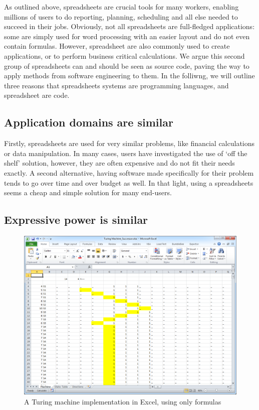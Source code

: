 \documentclass[conference]{IEEEtran}
\begin{document}


As outlined above, spreadsheets are crucial tools for many workers, enabling millions of users to do reporting, planning, scheduling and all else needed to succeed in their jobs. Obviously, not all spreadsheets are full-fledged applications: some are simply used for word processing with an easier layout and do not even contain formulas. However, spreadsheet are also commonly used to create applications, or to perform business critical calculations. We argue this second group of spreadsheets can and should be seen as source code, paving the way to apply methods from software engineering to them. In the folliwng, we will outline three reasons that spreadsheets systems are programming languages, and spreadsheet are code.

\subsection{Application domains are similar}
Firstly, spreadsheets are used for very similar problems, like financial calculations or data manipulation. In many cases, users have investigated the use of ‘off the shelf’ solution, however, they are often expensive and do not fit their needs exactly. A second alternative, having software made specifically for their problem tends to go over time and over budget as well. In that light, using a spreadsheets seems a cheap and simple solution for many end-users.

\subsection{Expressive power is similar}

\begin{figure}
  \begin{center}
  \includegraphics[width=\columnwidth]{fig/turing.png}
  \caption{A Turing machine implementation in Excel, using only formulas}
  \label{fig:visical}
  \end{center}
\end{figure} 
\end{document}
